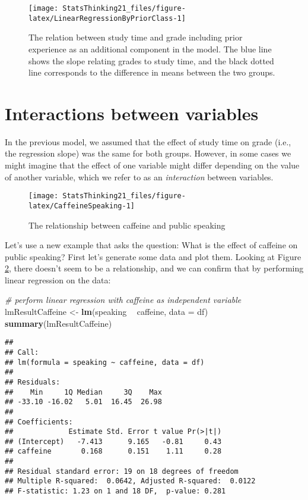 \documentclass[]{book}
\newenvironment{Shaded}{\begin{snugshade}}{\end{snugshade}}
\newcommand{\KeywordTok}[1]{\textcolor[rgb]{0.13,0.29,0.53}{\textbf{#1}}}
\newcommand{\DataTypeTok}[1]{\textcolor[rgb]{0.13,0.29,0.53}{#1}}
\newcommand{\StringTok}[1]{\textcolor[rgb]{0.31,0.60,0.02}{#1}}
\newcommand{\CommentTok}[1]{\textcolor[rgb]{0.56,0.35,0.01}{\textit{#1}}}
\newcommand{\OperatorTok}[1]{\textcolor[rgb]{0.81,0.36,0.00}{\textbf{#1}}}
\newcommand{\NormalTok}[1]{#1}
\theoremstyle{definition}
\theoremstyle{definition}
\theoremstyle{definition}
\theoremstyle{remark}
\begin{document}
\begin{figure}
\texttt{[image: StatsThinking21\_files/figure-latex/LinearRegressionByPriorClass-1]} \caption{The relation between study time and grade including prior experience as an additional component in the model.  The blue line shows the slope relating grades to study time, and the black dotted line corresponds to the difference in means between the two groups.}\label{fig:LinearRegressionByPriorClass}
\end{figure}

\section{Interactions between
variables}\label{interactions-between-variables}

In the previous model, we assumed that the effect of study time on grade
(i.e., the regression slope) was the same for both groups. However, in
some cases we might imagine that the effect of one variable might differ
depending on the value of another variable, which we refer to as an
\emph{interaction} between variables.

\begin{figure}
\texttt{[image: StatsThinking21\_files/figure-latex/CaffeineSpeaking-1]} \caption{The relationship between caffeine and public speaking}\label{fig:CaffeineSpeaking}
\end{figure}

Let's use a new example that asks the question: What is the effect of
caffeine on public speaking? First let's generate some data and plot
them. Looking at Figure \ref{fig:CaffeineSpeaking}, there doesn't seem
to be a relationship, and we can confirm that by performing linear
regression on the data:

\begin{Shaded}
\begin{Highlighting}[]
\CommentTok{# perform linear regression with caffeine as independent variable}
\NormalTok{lmResultCaffeine <-}\StringTok{ }\KeywordTok{lm}\NormalTok{(speaking }\OperatorTok{~}\StringTok{ }\NormalTok{caffeine, }\DataTypeTok{data =}\NormalTok{ df)}
\KeywordTok{summary}\NormalTok{(lmResultCaffeine)}
\end{Highlighting}
\end{Shaded}

\begin{verbatim}
## 
## Call:
## lm(formula = speaking ~ caffeine, data = df)
## 
## Residuals:
##    Min     1Q Median     3Q    Max 
## -33.10 -16.02   5.01  16.45  26.98 
## 
## Coefficients:
##             Estimate Std. Error t value Pr(>|t|)
## (Intercept)   -7.413      9.165   -0.81     0.43
## caffeine       0.168      0.151    1.11     0.28
## 
## Residual standard error: 19 on 18 degrees of freedom
## Multiple R-squared:  0.0642, Adjusted R-squared:  0.0122 
## F-statistic: 1.23 on 1 and 18 DF,  p-value: 0.281
\end{verbatim}
\end{document}
